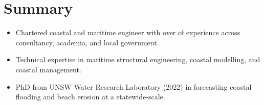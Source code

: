 \section{Summary}

\entryitemindent
{
	\begin{itemize}[noitemsep]
		\item Chartered coastal and maritime engineer with over  of experience across consultancy, academia, and local government.
		\item Technical expertise in maritime structural engineering, coastal modelling, and coastal management.
		\item PhD from UNSW Water Research Laboratory (2022) in forecasting coastal flooding and beach erosion at a statewide-scale.
	\end{itemize}
}


